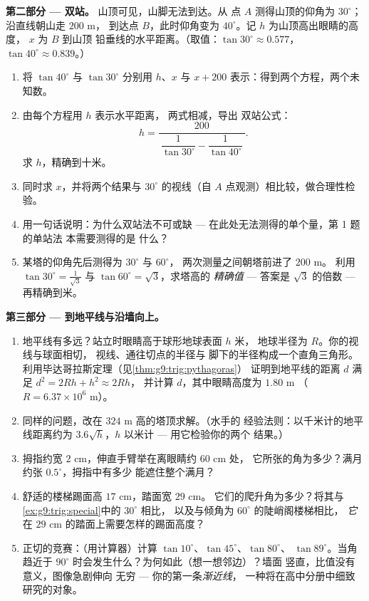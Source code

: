 \begin{problem}
\medskip
\noindent\textbf{第二部分 --- 双站。}
山顶可见，山脚无法到达。从
点 $A$ 测得山顶的仰角为 $30^\circ$；沿直线朝山走 $200$ m，
到达点 $B$，此时仰角变为
$40^\circ$。记 $h$ 为山顶高出眼睛的高度，
$x$ 为 $B$ 到山顶
铅垂线的水平距离。（取值：$\tan 30^\circ \approx 0.577$，
$\tan 40^\circ \approx 0.839$。）
\begin{enumerate}[resume]
  \item 将 $\tan 40^\circ$ 与 $\tan 30^\circ$ 分别用
        $h$、$x$ 与 $x + 200$ 表示：得到两个方程，两个未知数。
  \item 由每个方程用 $h$ 表示水平距离，
        两式相减，导出
        双站公式：
        \[
        h = \frac{200}
        {\ \dfrac{1}{\tan 30^\circ} - \dfrac{1}{\tan 40^\circ}\ } .
        \]
        求 $h$，精确到十米。
  \item 同时求 $x$，并将两个结果与
        $30^\circ$ 的视线（自 $A$ 点观测）相比较，做合理性检验。
  \item 用一句话说明：为什么双站法不可或缺 ---
        在此处无法测得的单个量，第 1 题的单站法
        本需要测得的是
        什么？
  \item 某塔的仰角先后测得为 $30^\circ$ 与 $60^\circ$，
        两次测量之间朝塔前进了 $200$ m。
        利用 $\tan 30^\circ = \frac{1}{\sqrt3}$ 与
        $\tan 60^\circ = \sqrt3$，求塔高的
        \emph{精确值} --- 答案是 $\sqrt3$ 的倍数 ---
        再精确到米。
\end{enumerate}

\medskip
\noindent\textbf{第三部分 --- 到地平线与沿墙向上。}
\begin{enumerate}[resume]
  \item 地平线有多远？站立时眼睛高于球形地球表面 $h$ 米，
        地球半径为 $R$。你的视线与球面相切，
        视线、通往切点的半径与
        脚下的半径构成一个直角三角形。
        利用毕达哥拉斯定理（见\cref{thm:g9:trig:pythagoras}）
        证明到地平线的距离 $d$
        满足 $d^2 = 2Rh + h^2 \approx 2Rh$，
        并计算 $d$，其中眼睛高度为 $1.80$ m
        （$R = 6.37 \times 10^6$ m）。
  \item 同样的问题，改在 $324$ m 高的塔顶求解。（水手的
        经验法则：以千米计的地平线距离约为
        $3.6\sqrt{h}$，$h$ 以米计 --- 用它检验你的两个
        结果。）
  \item 拇指约宽 $2$ cm，伸直手臂举在离眼睛约 $60$ cm 处，
        它所张的角为多少？满月约张
        $0.5^\circ$，拇指中有多少
        能遮住整个满月？
  \item 舒适的楼梯踢面高 $17$ cm，踏面宽 $29$ cm。
        它们的爬升角为多少？将其与
        \cref{ex:g9:trig:special}中的 $30^\circ$ 相比，
        以及与倾角为 $60^\circ$ 的陡峭阁楼梯相比，
        \emph{它}在 $29$ cm 的踏面上需要怎样的踢面高度？
  \item 正切的竞赛：（用计算器）计算
        $\tan 10^\circ$、$\tan 45^\circ$、$\tan 80^\circ$、
        $\tan 89^\circ$。当角趋近于
        $90^\circ$ 时会发生什么？为何如此（想一想邻边）？墙面
        竖直，比值没有意义，图像急剧伸向
        无穷 --- 你的第一条\emph{渐近线}，
        一种将在高中分册中细致研究的对象。
\end{enumerate}
\end{problem}
